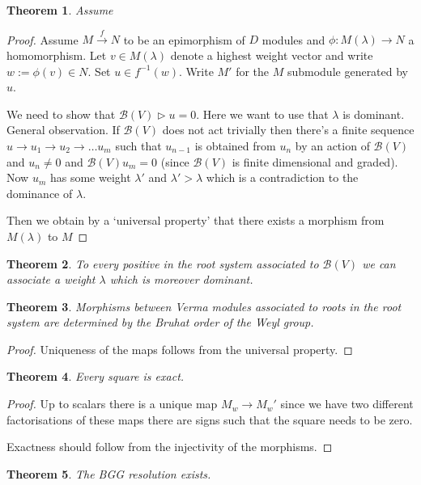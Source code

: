 \documentclass{amsart}
\newtheorem{theorem}{Theorem}
\theoremstyle{definition}
\newcommand{\Nichols}[1]{\ensuremath{\mathcal{B}(#1)}}
\begin{document}
\begin{theorem}
	Assume 
\end{theorem}

\begin{proof}
	Assume $M\xrightarrow{f}N$ to be an epimorphism of $D$ modules and $\phi: M(\lambda)\rightarrow N$ a homomorphism.
	Let $v\in M(\lambda)$ denote a highest weight vector and write $w:= \phi(v)\in N$.
	Set $u\in f^{-1}(w)$. Write $M'$ for the $M$ submodule generated by $u$.
	
	We need to show that $\Nichols V\triangleright u =0$. Here we want to use that $\lambda$ is dominant. 
	General observation. If $\Nichols V$ does not act trivially then there's a finite sequence 
	$u \rightarrow u_1 \rightarrow u_2 \rightarrow \dotsc u_m$ such that $u_{n-1}$ is obtained from $u_n$ by an action of $\Nichols V$ and $u_n \neq 0$ and  $\Nichols V u_m = 0$ (since $\Nichols V$ is finite dimensional and graded). Now $u_m$ has some weight $\lambda'$ and $\lambda'>\lambda$ which is a contradiction to the dominance of $\lambda$.
	
	Then we obtain by a `universal property' that there exists a morphism from $M(\lambda)$ to $M$
\end{proof}

\begin{theorem}
	To every positive  in the root system associated to $\Nichols V$ we can associate a weight $\lambda$ which is moreover dominant.
\end{theorem}

\begin{theorem}
	Morphisms between Verma modules associated to roots in the root system are determined by the Bruhat order of the Weyl group.
\end{theorem}
\begin{proof}
	Uniqueness of the maps follows from the universal property. 
\end{proof}

\begin{theorem}
	Every square is exact.
\end{theorem}
\begin{proof}
	 Up to scalars there is a unique map $M_w \rightarrow M_w'$ since we have two different factorisations of these maps there are signs such that the square needs to be zero. 
	 
	 Exactness should follow from the injectivity of the morphisms.
\end{proof}


\begin{theorem}
	The BGG resolution exists.
\end{theorem}
\end{document}
